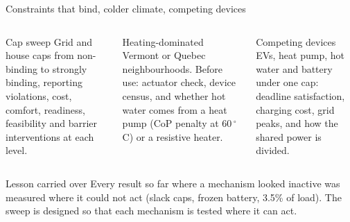 \documentclass[aspectratio=169,10pt]{beamer}
\begin{document}
\begin{frame}{Constraints that bind, colder climate, competing devices}
\begin{columns}[T]
\begin{block}{Cap sweep}
Grid and house caps from non-binding to strongly binding, reporting violations, cost, comfort, readiness, feasibility and barrier interventions at each level.
\end{block}
\begin{block}{Heating-dominated}
Vermont or Quebec neighbourhoods. Before use: actuator check, device census, and whether hot water comes from a heat pump (CoP penalty at 60\,$^\circ$C) or a resistive heater.
\end{block}
\begin{block}{Competing devices}
EVs, heat pump, hot water and battery under one cap: deadline satisfaction, charging cost, grid peaks, and how the shared power is divided.
\end{block}
\end{columns}
\vspace{0.6em}
\begin{alertblock}{Lesson carried over}
Every result so far where a mechanism looked inactive was measured where it could not act (slack caps, frozen battery, 3.5\% of load). The sweep is designed so that each mechanism is tested where it can act.
\end{alertblock}
\end{frame}
\end{document}
